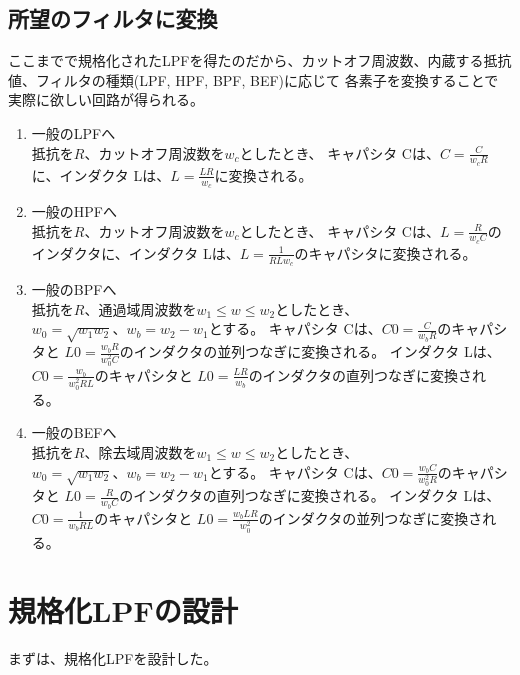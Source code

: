 \documentclass[a4j,twocolumn]{jsarticle}
\begin{document}
\subsection{所望のフィルタに変換}
ここまでで規格化されたLPFを得たのだから、カットオフ周波数、内蔵する抵抗値、フィルタの種類(LPF, HPF, BPF, BEF)に応じて
各素子を変換することで実際に欲しい回路が得られる。
\begin{enumerate}
\item 一般のLPFへ \\
$抵抗をR、カットオフ周波数をw_{c}$としたとき、
キャパシタ Cは、$C = \frac{C}{w_{c}R}$に、インダクタ Lは、$L = \frac{LR}{w_{c}}$に変換される。
\item 一般のHPFへ \\
$抵抗をR、カットオフ周波数をw_{c}$としたとき、
キャパシタ Cは、$L = \frac{R}{w_{c}C}$のインダクタに、インダクタ Lは、$L = \frac{1}{RLw_{c}}$のキャパシタに変換される。
\item 一般のBPFへ \\
$抵抗をR、通過域周波数をw_{1} \leq w \leq w_{2}$としたとき、
$w_{0} = \sqrt{w_{1}w_{2}}、w_{b} = w_{2} - w_{1}$とする。
キャパシタ Cは、$C0 = \frac{C}{w_{b}R}$のキャパシタと $L0 = \frac{w_{b}R}{w_{0}^{2}C}$のインダクタの並列つなぎに変換される。
インダクタ Lは、$C0 = \frac{w_{b}}{w_{0}^{2}RL}$のキャパシタと $L0 = \frac{LR}{w_{b}}$のインダクタの直列つなぎに変換される。
\item 一般のBEFへ \\
$抵抗をR、除去域周波数をw_{1} \leq w \leq w_{2}$としたとき、
$w_{0} = \sqrt{w_{1}w_{2}}、w_{b} = w_{2} - w_{1}$とする。
キャパシタ Cは、$C0 = \frac{w_{b}C}{w_{0}^{2}R}$のキャパシタと $L0 = \frac{R}{w_{b}C}$のインダクタの直列つなぎに変換される。
インダクタ Lは、$C0 = \frac{1}{w_{b}RL}$のキャパシタと $L0 = \frac{w_{b}LR}{w_{0}^{2}}$のインダクタの並列つなぎに変換される。
\end{enumerate}

\section{規格化LPFの設計}
まずは、規格化LPFを設計した。
\end{document}
